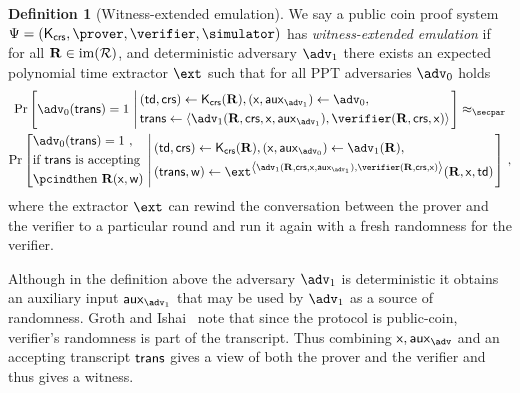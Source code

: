 \documentclass[runningheads,11pt]{llncs}
\theoremstyle{definition}
\newtheorem{definition}[theorem]{Definition}
\begin{document}
{\begin{definition}[Witness-extended emulation]
	\label{def:wit_ext_em}
	We say a public coin proof system $\proofsystem = (\kcrs, \prover, \verifier,
  \simulator)$ has \emph{witness-extended emulation} if for all $\mathbf{R} \in
  \operatorname{im}(\mathcal{R})$, and deterministic adversary $\adv_1$ there exists an
  expected polynomial time extractor $\ext$ such that for all PPT adversaries $\adv_0$ holds
		\begin{multline*}
		\Pr\left[\adv_0 (\trans) = 1 \,\left|\,
		\begin{aligned}
				& (\td, \crs) \gets \kcrs(\REL), (\inp, \aux_{\adv_1}) \gets \adv_0, \\
				& \trans \gets \ip{\adv_1(\REL, \crs, \inp, \aux_{\adv_1})}{\verifier(\REL, \crs, \inp)}
			\end{aligned}
		\right.
		\right]
		 \approx_\secpar \\
		 \Pr\left[
			\begin{aligned}
				& \adv_0 (\trans) = 1\ , \\
				& \text{if $\trans$ is accepting} \\
				& \pcind \text{then $\REL(\inp, \wit)$}
			\end{aligned}\,\left|\,
			\begin{aligned}
				& (\td, \crs) \gets \kcrs(\REL), (\inp, \aux_{\adv_0}) \gets \adv_1(\REL), \\
				& (\trans, \wit )\gets \ext^{\ip{\adv_1(\REL, \crs, \inp, \aux_{\adv_1})}{\verifier(\REL, \crs, \inp)}}(\REL, \inp, \td)
			\end{aligned}
			\vphantom{\begin{aligned}
				\adv (\trans) = 1, \\
				\text{if $\trans{}$ is accepting} \\
				\pcind \text{then $\REL(\inp, \wit)$}
			\end{aligned}}\right.
			\right]\,,
\end{multline*}
where the extractor $\ext$ can rewind the conversation between the prover and the verifier to a particular round and run it again with a fresh randomness for the verifier.
\end{definition}
Although in the definition above the adversary $\adv_1$ is deterministic it obtains an auxiliary input $\aux_{\adv_1}$ that may be used by $\adv_1$ as a source of randomness. Groth and Ishai~\cite{EC:GroIsh08} note that since the protocol is public-coin, verifier's randomness is part of the transcript. Thus combining $\inp, \aux_\adv$ and an accepting transcript $\mathsf{trans}$ gives a view of both the prover and the verifier and thus gives a witness.
}
\end{document}

